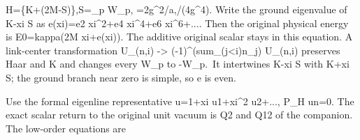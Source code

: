 \documentclass[11pt,a4paper]{article}
\renewcommand{\[}{\begingroup\small\originaldisplaystart}
\renewcommand{\]}{\originaldisplayend\endgroup}
\begin{document}
\[
 H=\kappa\{K+\xi(2M-S)\},\qquad S=\sum_p W_p,
 \quad\kappa=2g^2/a,\quad{}/(4g^4).
\] Write the ground eigenvalue of
{\ttfamily K\allowbreak{}-\allowbreak{}x\allowbreak{}i\allowbreak{} \allowbreak{}S\allowbreak{}}
as
{\ttfamily e\allowbreak{}(\allowbreak{}x\allowbreak{}i\allowbreak{})\allowbreak{}=\allowbreak{}e\allowbreak{}2\allowbreak{} \allowbreak{}x\allowbreak{}i\allowbreak{}\textasciicircum{}\allowbreak{}2\allowbreak{}+\allowbreak{}e\allowbreak{}4\allowbreak{} \allowbreak{}x\allowbreak{}i\allowbreak{}\textasciicircum{}\allowbreak{}4\allowbreak{}+\allowbreak{}e\allowbreak{}6\allowbreak{} \allowbreak{}x\allowbreak{}i\allowbreak{}\textasciicircum{}\allowbreak{}6\allowbreak{}+\allowbreak{}.\allowbreak{}.\allowbreak{}.\allowbreak{}}.
Then the original physical energy is
{\ttfamily E\allowbreak{}0\allowbreak{}=\allowbreak{}k\allowbreak{}a\allowbreak{}p\allowbreak{}p\allowbreak{}a\allowbreak{}(\allowbreak{}2\allowbreak{}M\allowbreak{} \allowbreak{}x\allowbreak{}i\allowbreak{}+\allowbreak{}e\allowbreak{}(\allowbreak{}x\allowbreak{}i\allowbreak{})\allowbreak{})\allowbreak{}}.
The additive original scalar stays in this equation. A link-center
transformation
{\ttfamily U\allowbreak{}\_\allowbreak{}(\allowbreak{}n\allowbreak{},\allowbreak{}i\allowbreak{})\allowbreak{} \allowbreak{}-\allowbreak{}\textgreater{}\allowbreak{} \allowbreak{}(\allowbreak{}-\allowbreak{}1\allowbreak{})\allowbreak{}\textasciicircum{}\allowbreak{}(\allowbreak{}s\allowbreak{}u\allowbreak{}m\allowbreak{}\_\allowbreak{}(\allowbreak{}j\allowbreak{}\textless{}\allowbreak{}i\allowbreak{})\allowbreak{}n\allowbreak{}\_\allowbreak{}j\allowbreak{})\allowbreak{} \allowbreak{}U\allowbreak{}\_\allowbreak{}(\allowbreak{}n\allowbreak{},\allowbreak{}i\allowbreak{})\allowbreak{}}
preserves Haar and K and changes every W\_p to -W\_p.~It intertwines
{\ttfamily K\allowbreak{}-\allowbreak{}x\allowbreak{}i\allowbreak{} \allowbreak{}S\allowbreak{}}
with
{\ttfamily K\allowbreak{}+\allowbreak{}x\allowbreak{}i\allowbreak{} \allowbreak{}S\allowbreak{}};
the ground branch near zero is simple, so e is even.

Use the formal eigenline representative
{\ttfamily u\allowbreak{}=\allowbreak{}1\allowbreak{}+\allowbreak{}x\allowbreak{}i\allowbreak{} \allowbreak{}u\allowbreak{}1\allowbreak{}+\allowbreak{}x\allowbreak{}i\allowbreak{}\textasciicircum{}\allowbreak{}2\allowbreak{} \allowbreak{}u\allowbreak{}2\allowbreak{}+\allowbreak{}.\allowbreak{}.\allowbreak{}.\allowbreak{}},
{\ttfamily P\allowbreak{}\_\allowbreak{}H\allowbreak{} \allowbreak{}u\allowbreak{}n\allowbreak{}=\allowbreak{}0\allowbreak{}}.
The exact scalar return to the original unit vacuum is Q2 and Q12 of the
companion. The low-order equations are
\end{document}
